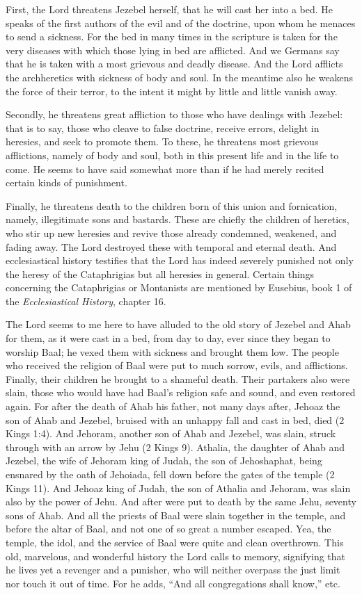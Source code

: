 First, the Lord threatens Jezebel herself, that he will cast her into a bed. He speaks of the first authors of the evil and of the doctrine, upon whom he menaces to send a sickness. For the bed in many times in the scripture is taken for the very diseases with which those lying in bed are afflicted. And we Germans say that he is taken with a most grievous and deadly disease. And the Lord afflicts the archheretics with sickness of body and soul. In the meantime also he weakens the force of their terror, to the intent it might by little and little vanish away.

Secondly, he threatens great affliction to those who have dealings with Jezebel: that is to say, those who cleave to false doctrine, receive errors, delight in heresies, and seek to promote them. To these, he threatens most grievous afflictions, namely of body and soul, both in this present life and in the life to come. He seems to have said somewhat more than if he had merely recited certain kinds of punishment.

Finally, he threatens death to the children born of this union and fornication, namely, illegitimate sons and bastards. These are chiefly the children of heretics, who stir up new heresies and revive those already condemned, weakened, and fading away. The Lord destroyed these with temporal and eternal death. And ecclesiastical history testifies that the Lord has indeed severely punished not only the heresy of the Cataphrigias but all heresies in general. Certain things concerning the Cataphrigias or Montanists are mentioned by Eusebius, book 1 of the \textit{Ecclesiastical History}, chapter 16.

The Lord seems to me here to have alluded to the old story of Jezebel and Ahab for them, as it were cast in a bed, from day to day, ever since they began to worship Baal; he vexed them with sickness and brought them low. The people who received the religion of Baal were put to much sorrow, evils, and afflictions. Finally, their children he brought to a shameful death. Their partakers also were slain, those who would have had Baal’s religion safe and sound, and even restored again. For after the death of Ahab his father, not many days after, Jehoaz the son of Ahab and Jezebel, bruised with an unhappy fall and cast in bed, died (2 Kings 1:4). And Jehoram, another son of Ahab and Jezebel, was slain, struck through with an arrow by Jehu (2 Kings 9). Athalia, the daughter of Ahab and Jezebel, the wife of Jehoram king of Judah, the son of Jehoshaphat, being ensnared by the oath of Jehoiada, fell down before the gates of the temple (2 Kings 11). And Jehoaz king of Judah, the son of Athalia and Jehoram, was slain also by the power of Jehu. And after were put to death by the same Jehu, seventy sons of Ahab. And all the priests of Baal were slain together in the temple, and before the altar of Baal, and not one of so great a number escaped. Yea, the temple, the idol, and the service of Baal were quite and clean overthrown. This old, marvelous, and wonderful history the Lord calls to memory, signifying that he lives yet a revenger and a punisher, who will neither overpass the just limit nor touch it out of time. For he adds, “And all congregations shall know,” etc.

